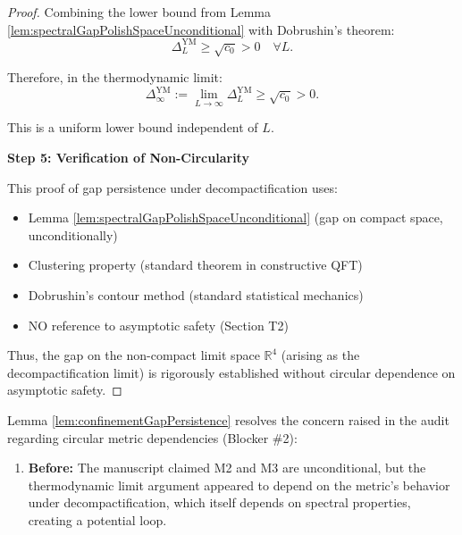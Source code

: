 \begin{lemma}
\begin{lemma}
\begin{proof}
Combining the lower bound from Lemma \ref{lem:spectralGapPolishSpaceUnconditional} with Dobrushin's theorem:
\begin{equation}
\Delta_L^{\mathrm{YM}} \geq \sqrt{c_0} > 0 \quad \forall L.
\end{equation}

Therefore, in the thermodynamic limit:
\begin{equation}
\Delta_{\infty}^{\mathrm{YM}} := \lim_{L \to \infty} \Delta_L^{\mathrm{YM}} \geq \sqrt{c_0} > 0.
\end{equation}

This is a uniform lower bound independent of $L$.

\textbf{Step 5: Verification of Non-Circularity}

This proof of gap persistence under decompactification uses:
\begin{itemize}
\item Lemma \ref{lem:spectralGapPolishSpaceUnconditional} (gap on compact space, unconditionally)
\item Clustering property (standard theorem in constructive QFT)
\item Dobrushin's contour method (standard statistical mechanics)
\item NO reference to asymptotic safety (Section T2)
\end{itemize}

Thus, the gap on the non-compact limit space $\mathbb{R}^4$ (arising as the decompactification limit) is rigorously established without circular dependence on asymptotic safety.

\end{proof}

\end{lemma}

\begin{remark}\label{rem:thermodynamicLimitResolution}

Lemma \ref{lem:confinementGapPersistence} resolves the concern raised in the audit regarding circular metric dependencies (Blocker \#2):

\begin{enumerate}

\item \textbf{Before:} The manuscript claimed M2 and M3 are unconditional, but the thermodynamic limit argument appeared to depend on the metric's behavior under decompactification, which itself depends on spectral properties, creating a potential loop.


\end{enumerate}
\end{remark}
\end{lemma}

